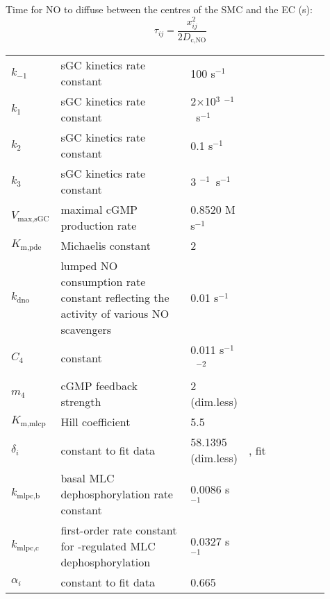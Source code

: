 \documentclass[fleqn]{report}
\numberwithin{equation}{section}
\numberwithin{equation}{section}
\newcommand{\cGMP}{\text{cGMP}}
\newcommand{\uMpers}{\textmu M\,s$^{-1}$}
\newcommand\e[1]{$\times$10$^{#1}$}
\newcommand{\n}{$^{-1}$}
\begin{document}
				Time for NO to diffuse between the centres of the SMC and the EC (s):
				\begin{equation}
					\tau_{ij} = \frac{x_{ij}^2}{2 D_{\text{c,NO}}}
				\end{equation}
				\begin{table}[h!] \label{tab:sGC}
					\centering
					\begin{tabular}{ p{0.1\linewidth}  >{\footnotesize} p{0.41\linewidth}  >{\footnotesize} p{0.14\linewidth} >{\footnotesize} p{0.26\linewidth} }
						\hline
						$ k_{-1} $ 				& sGC kinetics rate constant 	& 100 s\n 				& \citep{Yang2005} \\ 
						$ k_1 $ 				& sGC kinetics rate constant 	& 2\e{3} \uM\n\ s\n 		& \citep{Yang2005} \\ 
						$ k_2 $ 				& sGC kinetics rate constant 	& 0.1 s\n 				& \citep{Yang2005} \\ 
						$ k_3 $ 				& sGC kinetics rate constant 	& 3 \uM\n\ s\n 			& \citep{Yang2005} \\ 
						$ V_{\text{max,sGC}} $ 	& maximal cGMP production rate	& 0.8520 \uMpers  		& \citep{Yang2005} \\ 
						$ K_{\text{m,pde}} $ 	& Michaelis constant 			& 2 \uM 				& \citep{Yang2005} \\ 
						$ k_{\text{dno}}$ 		& lumped NO consumption rate constant reflecting the activity of various NO scavengers & 0.01 s\n & \citep{Yang2005} \\ 
						$ C_4 $ 				& constant 						& 0.011 s\n\ \uM$^{-2}$ 	& \citep{Yang2005} \\ 
						$ m_4 $ 				& cGMP feedback strength 		& 2 (dim.less) 			& \citep{Yang2005} \\
						$ K_{\text{m,mlcp}} $ 	& Hill coefficient				& 5.5 \uM 				& \citep{Yang2005} \\
						$ \delta_i $ 			& constant to fit data			& 58.1395 (dim.less)	& \citep{Hai1988}, fit\\
						$ k_{\text{mlpc,b}} $ 	& basal MLC dephosphorylation rate constant			& 0.0086 s\n  			& \citep{Yang2005} \\
						$ k_{\text{mlpc,c}} $ 	& first-order rate constant for \cGMP-regulated MLC dephosphorylation		& 0.0327 s\n 			& \citep{Yang2005} \\
						$ \alpha_i $ 			& constant to fit data			& 0.665 \uM  		&  \citep{Stockand1996}\\  %

\end{tabular}
\end{table}
\end{document}
